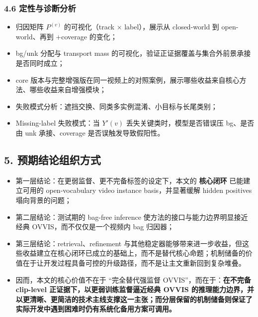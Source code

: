\documentclass[UTF8]{ctexart}
\begin{document}
\subsubsection*{4.6 定性与诊断分析}
\begin{itemize}
\item 归因矩阵 $P^{(v)}$ 的可视化（track $\times$ label），展示从 closed-world 到 open-world、再到 +coverage 的变化；
\item bg/unk 分配与 transport mass 的可视化，验证正证据覆盖与集合外前景承接是否同时成立；
\item core 版本与完整增强版在同一视频上的对照案例，展示哪些收益来自核心方法、哪些收益来自增强模块；
\item 失败模式分析：遮挡交换、同类多实例混淆、小目标与长尾类别；
\item Missing-label 失败模式：当 $Y'(v)$ 丢失关键类时，模型是否错误压 bg、是否由 unk 承接、coverage 是否误触发导致假阳性。
\end{itemize}

\par\noindent\hrulefill\par

\subsection*{5. 预期结论组织方式}
\begin{itemize}
\item 第一层结论：在更弱监督、更不完备标签的设定下，本文的 \textbf{核心闭环} 已能建立可用的 open-vocabulary video instance basis，并显著缓解 hidden positives 塌向背景的问题；
\item 第二层结论：测试期的 bag-free inference 使方法的接口与能力边界明显接近经典 OVVIS，而不仅仅是一个视频内 bag 归因器；
\item 第三层结论：retrieval、refinement 与其他稳定器能够带来进一步收益，但这些收益建立在核心闭环已成立的基础上，而不是替代核心命题；机制储备的价值在于让开发过程具备可控的升级路径，而不是让主文重新回到复杂堆叠。
\item 因而，本文的核心价值不在于 ``完全替代强监督 OVVIS''，而在于：\textbf{在不完备 clip-level 正证据下，以更弱训练监督逼近经典 OVVIS 的推理能力边界，并以更清晰、更简洁的技术主线支撑这一主张；而分层保留的机制储备则保证了实际开发中遇到困难时仍有系统化备用方案可调用。}
\end{itemize}

\par\noindent\hrulefill\par
\end{document}
